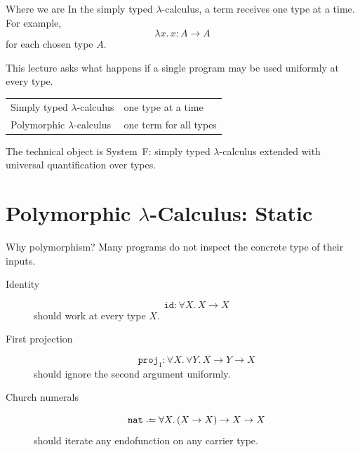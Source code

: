 %    
\begin{frame}{Where we are}
  In the simply typed $\lambda$-calculus, a term receives one type at a time.
  For example,
  \[
    \lambda x.\,x : A \to A
  \]
  for each chosen type $A$.

  \vfill

  This lecture asks what happens if a single program may be used uniformly at
  every type.

  \begin{center}
    \begin{tabular}{ll}
      Simply typed $\lambda$-calculus & one type at a time \\
      Polymorphic $\lambda$-calculus & one term for all types
    \end{tabular}
  \end{center}

  \vfill

  The technical object is System~F: simply typed $\lambda$-calculus extended
  with universal quantification over types.
\end{frame}

\section{Polymorphic \texorpdfstring{$\lambda$}{λ}-Calculus: Static}

\begin{frame}{Why polymorphism?}
  Many programs do not inspect the concrete type of their inputs.

  \begin{description}
    \item[Identity]
      \[
        \mathtt{id} : \forall X.\,X \to X
      \]
      should work at every type $X$.

    \item[First projection]
      \[
        \mathtt{proj}_1 : \forall X.\,\forall Y.\,X \to Y \to X
      \]
      should ignore the second argument uniformly.

    \item[Church numerals]
      \[
        \nat \defeq \forall X.\,(X \to X) \to X \to X
      \]
      should iterate any endofunction on any carrier type.
  \end{description}
\end{frame}

